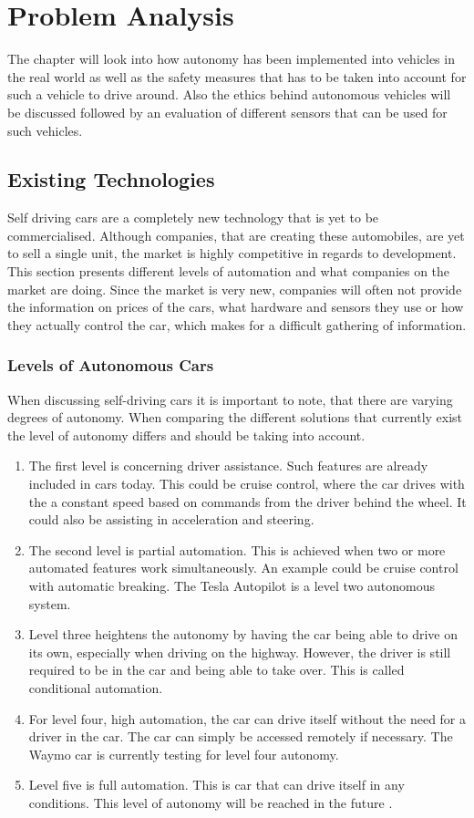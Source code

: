 \chapter{Problem Analysis}\label{ch:PA}
The chapter will look into how autonomy has been implemented into vehicles in the real world as well as the safety measures that has to be taken into account for such a vehicle to drive around. Also the ethics behind autonomous vehicles will be discussed followed by an evaluation of different sensors that can be used for such vehicles.

\section{Existing Technologies} \label{Existing technologies}
Self driving cars are a completely new technology that is yet to be commercialised. Although companies, that are creating these automobiles, are yet to sell a single unit, the market is highly competitive in regards to development. 
This section presents different levels of automation and what companies on the market are doing. Since the market is very new, companies will often not provide the information on prices of the cars, what hardware and sensors they use or how they actually control the car, which makes for a difficult gathering of information.


\subsection{Levels of Autonomous Cars}
When discussing self-driving cars it is important to note, that there are varying degrees of autonomy. When comparing the different solutions that currently exist the level of autonomy differs and should be taking into account. 
\begin{enumerate}
\item The first level is concerning driver assistance. Such features are already included in cars today. This could be cruise control, where the car drives with the a constant speed based on commands from the driver behind the wheel. It could also be assisting in acceleration and steering.
\item The second level is partial automation. This is achieved when two or more automated features work simultaneously. An example could be cruise control with automatic breaking. The Tesla Autopilot is a level two autonomous system.
\item Level three heightens the autonomy by having the car being able to drive on its own, especially when driving on the highway. However, the driver is still required to be in the car and being able to take over. This is called conditional automation.
\item For level four, high automation, the car can drive itself without the need for a driver in the car. The car can simply be accessed remotely if necessary. The Waymo car is currently testing for level four autonomy.
\item Level five is full automation. This is car that can drive itself in any conditions. This level of autonomy will be reached in the future \cite{Autonomylevel}\cite{AutonomyLevel2}.
\end{enumerate}


